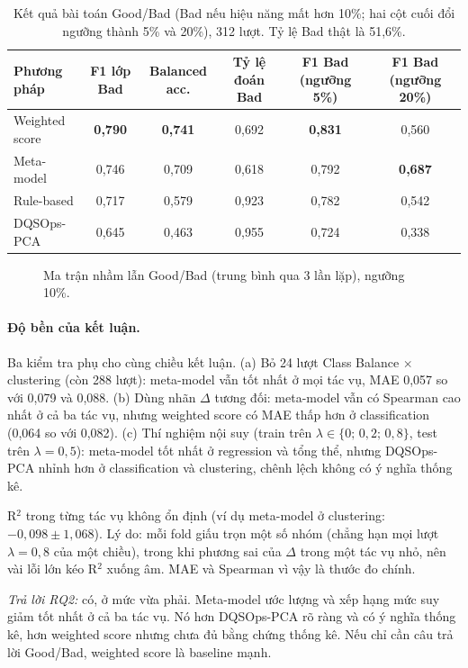 \begin{table}[ht]
\centering
\small
\begin{tabular}{@{}lccccc@{}}
\toprule
Phương pháp & F1 lớp Bad & Balanced acc. & Tỷ lệ đoán Bad & F1 Bad (ngưỡng 5\%) & F1 Bad (ngưỡng 20\%) \\
\midrule
Weighted score & \textbf{0,790} & \textbf{0,741} & 0,692 & \textbf{0,831} & 0,560 \\
Meta-model     & 0,746 & 0,709 & 0,618 & 0,792 & \textbf{0,687} \\
Rule-based     & 0,717 & 0,579 & 0,923 & 0,782 & 0,542 \\
DQSOps-PCA     & 0,645 & 0,463 & 0,955 & 0,724 & 0,338 \\
\bottomrule
\end{tabular}
\caption{Kết quả bài toán Good/Bad (Bad nếu hiệu năng mất hơn 10\%; hai cột cuối đổi ngưỡng thành 5\% và 20\%), 312 lượt. Tỷ lệ Bad thật là 51,6\%.}
\label{tab:goodbad}
\end{table}

\begin{figure}[ht]
\centering
{}
\caption{Ma trận nhầm lẫn Good/Bad (trung bình qua 3 lần lặp), ngưỡng 10\%.}
\label{fig:h7}
\end{figure}

\paragraph{Độ bền của kết luận.} Ba kiểm tra phụ cho cùng chiều kết luận. (a) Bỏ 24 lượt Class Balance $\times$ clustering (còn 288 lượt): meta-model vẫn tốt nhất ở mọi tác vụ, MAE 0,057 so với 0,079 và 0,088. (b) Dùng nhãn $\Delta$ tương đối: meta-model vẫn có Spearman cao nhất ở cả ba tác vụ, nhưng weighted score có MAE thấp hơn ở classification (0,064 so với 0,082). (c) Thí nghiệm nội suy (train trên $\lambda \in \{0;\,0{,}2;\,0{,}8\}$, test trên $\lambda = 0{,}5$): meta-model tốt nhất ở regression và tổng thể, nhưng DQSOps-PCA nhỉnh hơn ở classification và clustering, chênh lệch không có ý nghĩa thống kê.

R$^2$ trong từng tác vụ không ổn định (ví dụ meta-model ở clustering: $-0{,}098 \pm 1{,}068$). Lý do: mỗi fold giấu trọn một số nhóm (chẳng hạn mọi lượt $\lambda = 0{,}8$ của một chiều), trong khi phương sai của $\Delta$ trong một tác vụ nhỏ, nên vài lỗi lớn kéo R$^2$ xuống âm. MAE và Spearman vì vậy là thước đo chính.

\emph{Trả lời RQ2:} có, ở mức vừa phải. Meta-model ước lượng và xếp hạng mức suy giảm tốt nhất ở cả ba tác vụ. Nó hơn DQSOps-PCA rõ ràng và có ý nghĩa thống kê, hơn weighted score nhưng chưa đủ bằng chứng thống kê. Nếu chỉ cần câu trả lời Good/Bad, weighted score là baseline mạnh.


